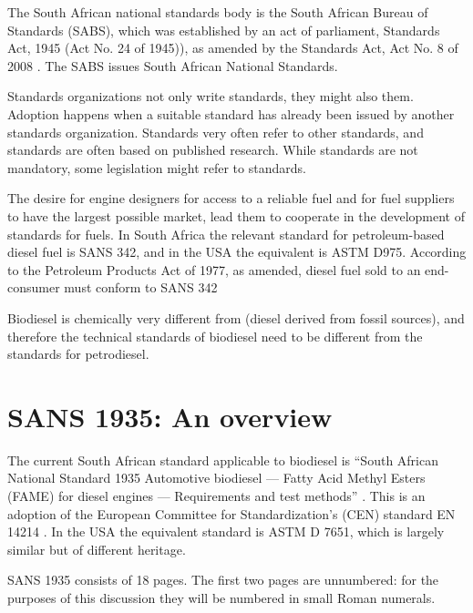 The South African national standards body is the South African Bureau of
Standards (SABS), which was established by an act of parliament,
 Standards Act, 1945 (Act No. 24 of 1945)), as amended by the Standards Act, Act
 No. 8 of 2008 \autocite{Act8-2008}. The SABS issues South African National
 Standards.

Standards organizations not only write standards, they might also
 them. Adoption happens when a suitable standard has already been
issued by another standards organization. Standards very often refer to other
standards, and standards are often based on published research. While standards
are not mandatory, some legislation might refer to standards. 

The desire for engine designers for access to a reliable fuel and for fuel
suppliers to have the largest possible market, lead them to cooperate in the
development of standards for fuels. In South Africa the relevant standard for
petroleum-based diesel fuel is SANS 342, and in the USA the equivalent is ASTM
D975. According to the Petroleum Products Act of 1977, as amended, diesel fuel
sold to an end-consumer must conform to SANS 342

Biodiesel is chemically very different from  (diesel
derived from fossil sources), and therefore the technical standards of biodiesel
need to be different from the standards for petrodiesel.

\section{SANS 1935: An overview}

The current South African standard applicable to biodiesel is ``South African
National Standard 1935 Automotive biodiesel — Fatty Acid Methyl Esters (FAME)
for diesel engines — Requirements and test methods'' \autocite{SANS1935}. This
is an adoption of the European Committee for Standardization's (CEN) standard EN
14214 \autocite{EN14214}. In the USA the equivalent standard is ASTM D 7651,
which is largely similar but of different heritage.

SANS 1935 consists of 18 pages. The first two pages are unnumbered: for the
purposes of this discussion they will be numbered in small Roman numerals.

